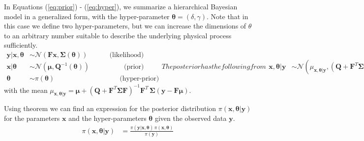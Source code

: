 In Equations (\ref{eq:prior}) - (\ref{eq:hyper}), we summarize a hierarchical Bayesian model in a generalized form, with the hyper-parameter $\bm{\theta} = (\delta, \gamma)$.
Note that in this case we define two hyper-parameters, but we can increase the dimensions of $\theta$ to an arbitrary number suitable to describe the underlying physical process sufficiently.
\begin{subequations}
\begin{align}
     \label{eq:likeli}
    \bm{y|x, \theta} &\sim \mathcal{N}(\bm{F x}, \bm{\Sigma}(\bm{\theta}) ) \qquad \quad   \, \text{(likelihood)}\\
    \label{eq:prior}
    \bm{x| \theta} &\sim \mathcal{N}(\bm{\mu}, \bm{Q}^{-1}(\bm{\theta}) ) \qquad \qquad  \quad \! \! \! \text{(prior)} \\
    \label{eq:hyper}
    \bm{\theta} &\sim \pi(\bm{\theta}) \qquad \qquad \qquad \qquad \quad \; \, \text{(hyper-prior)}
 \end{align}
 The posterior has the following from
 \begin{align}
     \label{eq:post}
    \bm{x , \theta|y} &\sim \mathcal{N}( \mu_{\bm{x , \theta|y} } , ( \bm{Q} + \bm{F}^T\bm{\Sigma}\bm{F} )^{-1} ) \quad  \text{(posterior)}
\end{align}
\end{subequations}
with the mean $\mu_{\bm{x , \theta|y} } = \bm{\mu} + (\bm{Q} + \bm{F}^T \bm{\Sigma} \bm{F})^{-1} \bm{F}^T \, \bm{\Sigma} (\bm{y} - \bm{F \mu})$. 


Using  theorem we can find an expression for the posterior distribution $\pi (\bm{x} , \bm{\theta} | \bm{y})$ for the parameters $\bm{x}$ and the hyper-parameters $\bm{\theta}$ given the observed data $\bm{y}$.
\begin{align}
    \pi (\bm{x} , \bm{\theta} | \bm{y}) &= \frac{\pi( \bm{y} | \bm{x}, \bm{\theta} ) \, \pi(\bm{x},  \bm{\theta}) }{\pi(\bm{y})}
\end{align}

